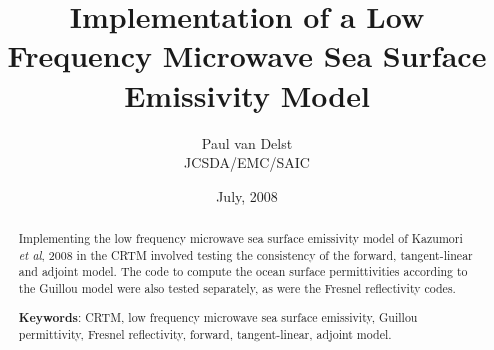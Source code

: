



\newcommand{\rb}[1]{\raisebox{1.5ex}[0pt]{#1}}
\newcommand{\de}{\ensuremath{\delta\epsilon}}
\newcommand{\es}{\ensuremath{\epsilon_{s}}}
\newcommand{\einf}{\ensuremath{\epsilon_{\infty}}}
\newcommand{\eo}{\ensuremath{\epsilon_{0}}}
\newcommand{\twopnt}{\ensuremath{2\pi\nu\tau}}
\newcommand{\dstar}{\ensuremath{\delta^{*}\!}}

\title{Implementation of a Low Frequency Microwave Sea Surface Emissivity Model}
\author{Paul van Delst\\JCSDA/EMC/SAIC}
\date{July, 2008}



\maketitle

\draftwatermark

\begin{abstract}
Implementing the low frequency microwave sea surface emissivity model of Kazumori \textit{et al}, 2008\cite{Kazumori_etal_2008} in the CRTM involved testing the consistency of the forward, tangent-linear and adjoint model. The code to compute the ocean surface permittivities according to the Guillou\cite{Guillou_etal_1998} model were also tested separately, as were the Fresnel reflectivity codes.

\textbf{Keywords}: CRTM, low frequency microwave sea surface emissivity, Guillou permittivity, Fresnel reflectivity, forward, tangent-linear, adjoint model.
\end{abstract}












	


\begin{appendix}
  
  
\end{appendix}



